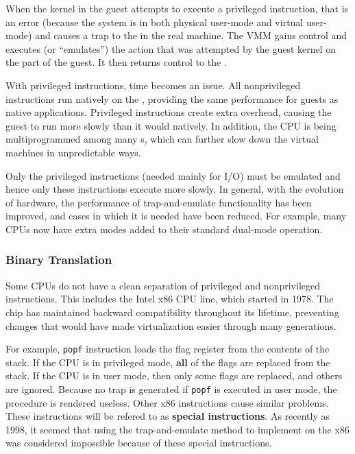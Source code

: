When the kernel in the guest attempts to execute a privileged instruction, that is an error (because the system is in both physical user-mode and virtual user-mode) and causes a trap to the  in the real machine.
The VMM gains control and executes (or ``emulates'') the action that was attempted by the guest kernel on the part of the guest.
It then returns control to the .

With privileged instructions, time becomes an issue.
All nonprivileged instructions run natively on the , providing the same performance for guests as native applications.
Privileged instructions create extra overhead, causing the guest to run more slowly than it would natively.
In addition, the CPU is being multiprogrammed among many s, which can further slow down the virtual machines in unpredictable ways.

Only the privileged instructions (needed mainly for I/O) must be emulated and hence only these instructions execute more slowly.
In general, with the evolution of hardware, the performance of trap-and-emulate functionality has been improved, and cases in which it is needed have been reduced.
For example, many CPUs now have extra modes added to their standard dual-mode operation.

\subsubsection{Binary Translation}\label{subsubsec:Binary_Translation}
Some CPUs do not have a clean separation of privileged and nonprivileged instructions.
This includes the Intel x86 CPU line, which started in 1978.
The chip has maintained backward compatibility throughout its lifetime, preventing changes that would have made virtualization easier through many generations.

For example, \texttt{popf} instruction loads the flag register from the contents of the stack.
If the CPU is in privileged mode, \textbf{all} of the flags are replaced from the stack.
If the CPU is in user mode, then only some flags are replaced, and others are ignored.
Because no trap is generated if \texttt{popf} is executed in user mode, the  procedure is rendered useless.
Other x86 instructions cause similar problems.
These instructions will be refered to as \textbf{special instructions}.
As recently as 1998, it seemed that using the trap-and-emulate method to implement  on the x86 was considered impossible because of these special instructions.

